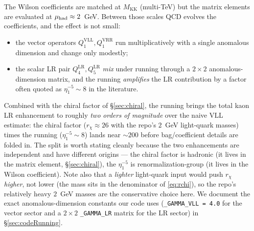 \documentclass[11pt]{article}
\newcommand{\MKK}{M_{\mathrm{KK}}}
\newcommand{\QVLL}{Q_1^{\mathrm{VLL}}}
\newcommand{\QVRR}{Q_1^{\mathrm{VRR}}}
\newcommand{\QLRfour}{Q_4^{\mathrm{LR}}}
\newcommand{\QLRfive}{Q_5^{\mathrm{LR}}}
\newcommand{\code}[1]{\texttt{#1}}
\theoremstyle{definition}
\begin{document}
The Wilson coefficients are matched at $\MKK$ (multi-TeV) but the matrix elements
are evaluated at $\mu_{\rm had}\approx2$~GeV. Between those scales QCD evolves the
coefficients, and the effect is not small:
\begin{itemize}[leftmargin=1.4em]
\item the vector operators $\QVLL,\QVRR$ run multiplicatively with a single
anomalous dimension and change only modestly;
\item the scalar LR pair $\QLRfour,\QLRfive$ \emph{mix} under running through a
$2\times2$ anomalous-dimension matrix, and the running \emph{amplifies} the LR
contribution by a factor often quoted as $\eta_1^{-5}\sim8$ in the literature.
\end{itemize}
Combined with the chiral factor of \S\ref{sec:chiral}, the running brings the
total kaon LR enhancement to roughly \emph{two orders of magnitude} over the naive
VLL estimate: the chiral factor ($r_\chi\approx26$ with the repo's $2$~GeV
light-quark masses) times the running ($\eta_1^{-5}\sim8$) lands near $\sim200$
before bag/coefficient details are folded in. The split is worth stating cleanly
because the two enhancements are independent and have different origins --- the
chiral factor is hadronic (it lives in the matrix element, \S\ref{sec:chiral}),
the $\eta_1^{-5}$ is renormalization-group (it lives in the Wilson coefficient).
Note also that a \emph{lighter} light-quark input would push $r_\chi$
\emph{higher}, not lower (the mass sits in the denominator of \eqref{eq:rchi}), so
the repo's relatively heavy $2$~GeV masses are the conservative choice here. We
document the exact anomalous-dimension constants our code uses
(\code{\_GAMMA\_VLL = 4.0} for the vector sector and a $2\times2$
\code{\_GAMMA\_LR} matrix for the LR sector) in \S\ref{sec:codeRunning}.
\end{document}
